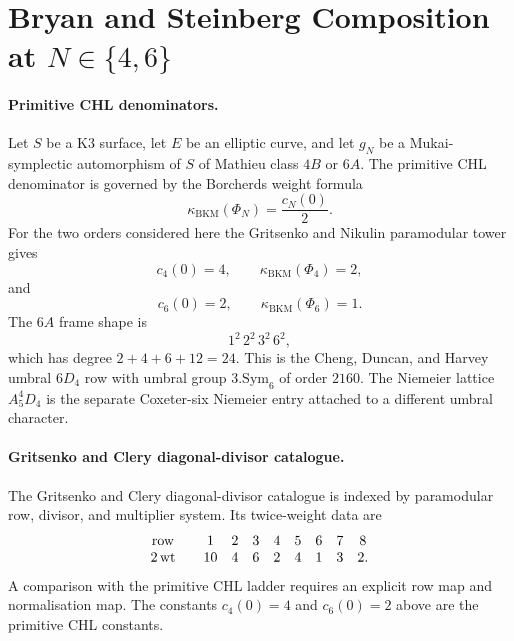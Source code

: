 \section{Bryan and Steinberg Composition at
\texorpdfstring{$N\in\{4,6\}$}{N in \{4,6\}}}%
\label{wn:sec:bryan-steinberg-N46}

\providecommand{\kBKM}{\kappa_{\mathrm{BKM}}}
\providecommand{\kch}{\kappa_{\mathrm{ch}}}
\providecommand{\kcat}{\kappa_{\mathrm{cat}}}
\providecommand{\kfib}{\kappa_{\mathrm{fiber}}}
\providecommand{\DTred}{Z^{\mathrm{red}}_{\mathrm{DT}}}
\providecommand{\FCHL}{F^{\mathrm{CHL}}}
\providecommand{\Z}{\mathbb{Z}}

\paragraph{Primitive CHL denominators.}
Let \(S\) be a K3 surface, let \(E\) be an elliptic curve, and let
\(g_N\) be a Mukai-symplectic automorphism of \(S\) of Mathieu class
\(4B\) or \(6A\). The primitive CHL denominator is governed by the
Borcherds weight formula
\[
\kBKM(\Phi_N)=\frac{c_N(0)}{2}.
\]
For the two orders considered here the Gritsenko and Nikulin
paramodular tower gives
\[
c_4(0)=4,\qquad \kBKM(\Phi_4)=2,
\]
and
\[
c_6(0)=2,\qquad \kBKM(\Phi_6)=1.
\]
The \(6A\) frame shape is
\[
1^2\,2^2\,3^2\,6^2,
\]
which has degree \(2+4+6+12=24\). This is the Cheng, Duncan, and
Harvey umbral \(6D_4\) row with umbral group \(3.\mathrm{Sym}_6\) of
order \(2160\). The Niemeier lattice \(A_5^4D_4\) is the separate
Coxeter-six Niemeier entry attached to a different umbral character.

\paragraph{Gritsenko and Clery diagonal-divisor catalogue.}
The Gritsenko and Clery diagonal-divisor catalogue is indexed by
paramodular row, divisor, and multiplier system. Its twice-weight data
are
\[
\begin{array}{c@{\qquad}cccccccc}
\mathrm{row} & 1 & 2 & 3 & 4 & 5 & 6 & 7 & 8\\
2\,\mathrm{wt} & 10 & 4 & 6 & 2 & 4 & 1 & 3 & 2 .
\end{array}
\]
A comparison with the primitive CHL ladder requires an explicit row map
and normalisation map. The constants \(c_4(0)=4\) and \(c_6(0)=2\)
above are the primitive CHL constants.


